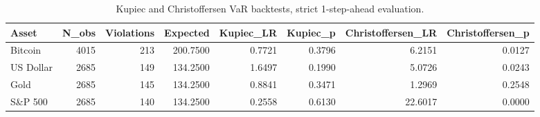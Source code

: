 \begin{table}
\caption{Kupiec and Christoffersen VaR backtests, strict 1-step-ahead evaluation.}
\label{tab:var_backtest}
\begin{tabular}{lrrrrrrr}
\toprule
Asset & N\_obs & Violations & Expected & Kupiec\_LR & Kupiec\_p & Christoffersen\_LR & Christoffersen\_p \\
\midrule
Bitcoin & 4015 & 213 & 200.7500 & 0.7721 & 0.3796 & 6.2151 & 0.0127 \\
US Dollar & 2685 & 149 & 134.2500 & 1.6497 & 0.1990 & 5.0726 & 0.0243 \\
Gold & 2685 & 145 & 134.2500 & 0.8841 & 0.3471 & 1.2969 & 0.2548 \\
S\&P 500 & 2685 & 140 & 134.2500 & 0.2558 & 0.6130 & 22.6017 & 0.0000 \\
\bottomrule
\end{tabular}
\end{table}
